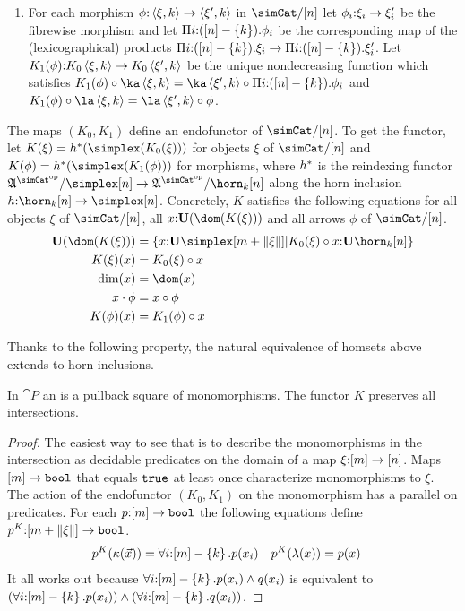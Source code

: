 \documentclass[csh.tex]{subfiles}
\begin{document}
\begin{definition}
\begin{enumerate}
\item For each morphism $\phi\mathord :\left\langle \xi,k \right\rangle\to\left\langle \xi',k \right\rangle$ in $\simCat/[n]$ let $\phi_i\mathord :\xi_i\to\xi'_i$ be the fibrewise morphism and let $\Pi i\mathord :([n]-\left\{k\right\}) .{\phi_i}$ be the corresponding map of the (lexicographical) products $\Pi i\mathord :([n]-\left\{k\right\}) .{\xi_i}\to\Pi i\mathord :([n]-\left\{k\right\}) .{\xi'_i}$. Let $K_1(\phi)\mathord : K_0\left\langle \xi,k \right\rangle\to K_0\left\langle \xi',k \right\rangle$ be the unique nondecreasing function which satisfies $K_1(\phi)\circ \ka\tuplet{\xi,k} = \ka\tuplet{\xi',k}\circ \product{i\of([n]-\set k)}{\phi_i}$ and $K_1(\phi)\circ \la\tuplet{\xi,k} = \la\tuplet{\xi',k}\circ \phi$.
\end{enumerate}

The maps $(K_0,K_1)$ define an endofunctor of $\simCat/[n]$. To get the functor, let $K(\xi) = h\ri(\simplex(K_0(\xi)))$ for objects $\xi$ of $\simCat/[n]$ and $K(\phi) = h\ri(\simplex(K_1(\phi)))$ for morphisms, where $h^*$ is the reindexing functor $\ambient\s/\simplex[n]\to\ambient\s/\horn_k[n]$ along the horn inclusion $h\of \horn_k[n]\to\simplex[n]$. Concretely, $K$ satisfies the following equations for all objects $\xi$ of $\simCat/[n]$, all $x\of \base(\dom(K(\xi)))$ and all arrows $\phi$ of $\simCat/[n]$.
\begin{align*}
\base(\dom(K(\xi))) &= \set{ x\of\base\simplex[m+\norm\xi]| K_0(\xi)\circ x\of\base\horn_k[n]}\\
K(\xi)(x) &= K_0(\xi)\circ x \\
\dim(x) &= \dom(x) \\
x\cdot\phi &= x\circ\phi \\
K(\phi)(x) &= K_1(\phi)\circ x
\end{align*}
\end{definition}

Thanks to the following property, the natural equivalence of homsets above extends to horn inclusions.

\begin{lemma} In $\cat P$ an  is a pullback square of monomorphisms. The functor $K$ preserves all intersections. \end{lemma}


\begin{proof} The easiest way to see that is to describe the monomorphisms in the intersection as decidable predicates on the domain of a map $\xi\mathord :[m]\to[n]$. Maps $[m]\to\mathtt{bool}$ that equals $\mathtt{true}$ at least once characterize monomorphisms to $\xi$. The action of the endofunctor $(K_0,K_1)$ on the monomorphism has a parallel on predicates. For each $p\mathord :[m]\to\mathtt{bool}$ the following equations define $p^K\mathord : [m+\Vert \xi \Vert]\to\mathtt{bool}$. 
\begin{align*}
p^K(\kappa(\vec x)) &= \forall i\mathord :[m]-\left\{k\right\}.p(x_i) &
p^K(\lambda(x)) &= p(x)
\end{align*}
It all works out because $\forall i\mathord :[m]-\left\{k\right\}.p(x_i)\land q(x_i)$ is equivalent to $(\forall i\mathord :[m]-\left\{k\right\}.p(x_i))\land(\forall i\mathord :[m]-\left\{k\right\}.q(x_i))$.
\end{proof}
\end{document}
